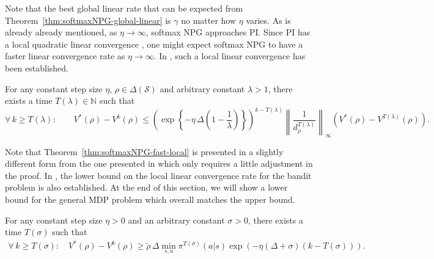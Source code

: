 Note that  the best global linear rate that can be expected from Theorem~\ref{thm:softmaxNPG-global-linear} is $\gamma$ no matter how $\eta$ varies. As is already already mentioned, as $\eta\rightarrow\infty$, softmax NPG approaches PI. Since PI has a local quadratic linear convergence \cite{PI-super},  one might expect softmax NPG to have a faster linear convergence rate as $\eta\to\infty$. In \cite{Khodadadian_Jhunjhunwala_Varma_Maguluri_2021}, such a local linear convergence has been established. 
\begin{theorem}\label{thm:softmaxNPG-fast-local} For any constant step size $\eta$, $\rho \in \Delta(\mathcal{S})$ and  arbitrary constant $\lambda > 1$, there exists a time $T(\lambda) \in \mathbb{N}$  such that 
$$
\forall\, k\ge T\left( \lambda \right) :\qquad V^*\left( \rho \right) -V^k\left( \rho \right) \le \left( \exp \left\{ -\eta\, \Delta \left( 1-\frac{1}{\lambda} \right) \right\} \right) ^{k-T\left( \lambda \right)}\left\| \frac{1}{d_{\rho}^{T\left( \lambda \right)}} \right\| _{\infty}\left( V^*\left( \rho \right) -V^{T\left( \lambda \right)}\left( \rho \right) \right).
$$
    
\end{theorem}
Note that Theorem~\ref{thm:softmaxNPG-fast-local} is presented in a slightly different form from the one presented in \cite{Khodadadian_Jhunjhunwala_Varma_Maguluri_2021} which only requires a little adjustment in the proof.
In \cite{Khodadadian_Jhunjhunwala_Varma_Maguluri_2021}, the lower bound on the local linear convergence rate for the bandit problem is also established. At the end of this section, we will show a lower bound for the general MDP problem which overall matches the upper bound.
\begin{theorem}
For any constant step size $\eta>0$ and an arbitrary constant $\sigma>0$, there exists a time $T(\sigma)$ such that 
\begin{align*}
\forall\,k\geq T(\sigma):\quad V^*(\rho)-V^k(\rho)\geq \tilde{\rho}\,\Delta \min_{s,a}\pi^{T(\sigma)}(a|s)\exp\left(-\eta(\Delta+\sigma)(k-T(\sigma))\right).
\end{align*}
 
\end{theorem}

